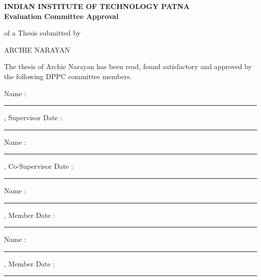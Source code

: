 \clearpage
\begin{center}
\textbf{INDIAN INSTITUTE OF TECHNOLOGY PATNA}\\
\textbf{Evaluation Committee Approval}

\vspace{1cm}
of a Thesis submitted by

\vspace{0.5cm}
ARCHIE NARAYAN
\end{center}

\vspace{1cm}
\noindent The thesis of Archie Narayan has been read, found satisfactory and approved by the following DPPC committee members.

\vspace{1.5cm}
\noindent Name : \rule{6cm}{0.4pt}, Supervisor \hfill Date : \rule{3cm}{0.4pt}

\vspace{1cm}
\noindent Name : \rule{6cm}{0.4pt}, Co-Supervisor \hfill Date : \rule{3cm}{0.4pt}

\vspace{1cm}
\noindent Name : \rule{6cm}{0.4pt}, Member \hfill Date : \rule{3cm}{0.4pt}

\vspace{1cm}
\noindent Name : \rule{6cm}{0.4pt}, Member \hfill Date : \rule{3cm}{0.4pt}
